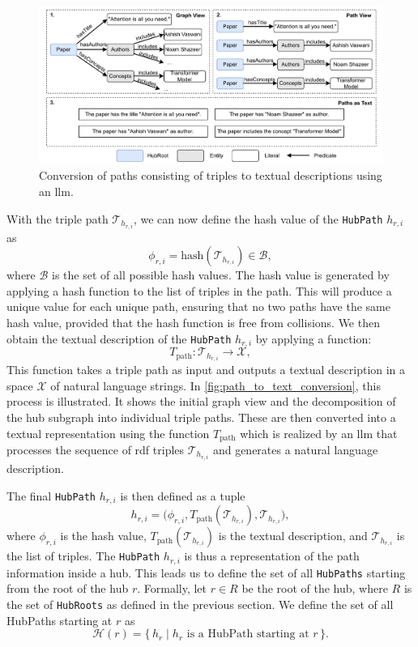\begin{figure}[t]
    \centering
    \includegraphics[width=1.0\linewidth]{figures/hublink/Hublink_figures-build_hubs.drawio.pdf}
    \caption[Path to Text Conversion]{Conversion of paths consisting of triples to textual descriptions using an \gls{llm}.}
    \label{fig:path_to_text_conversion}
\end{figure}

With the triple path $\mathcal{T}_{h_{r,i}}$, we can now define the hash value of the \texttt{HubPath} \(h_{r,i}\) as
\[
\phi_{r,i} = \text{hash}(\mathcal{T}_{h_{r,i}}) \in \mathcal{B},
\]
where \(\mathcal{B}\) is the set of all possible hash values. The hash value is generated by applying a hash function to the list of triples in the path. This will produce a unique value for each unique path, ensuring that no two paths have the same hash value, provided that the hash function is free from collisions. We then obtain the textual description of the \texttt{HubPath} \(h_{r,i}\) by applying a function:
\[
T_{\text{path}}: \mathcal{T}_{h_{r,i}} \to \mathcal{X},
\]
This function takes a triple path as input and outputs a textual description in a space \(\mathcal{X}\) of natural language strings. In \autoref{fig:path_to_text_conversion}, this process is illustrated. It shows the initial graph view and the decomposition of the hub subgraph into individual triple paths. These are then converted into a textual representation using the function \(T_{\text{path}}\) which is realized by an \gls{llm} that processes the sequence of \gls{rdf} triples $\mathcal{T}_{h_{r,i}}$ and generates a natural language description.

The final \texttt{HubPath} \(h_{r,i}\) is then defined as a tuple
\[
h_{r,i} = \bigl( \phi_{r,i}, T_{\text{path}}(\mathcal{T}_{h_{r,i}}), \mathcal{T}_{h_{r,i}} \bigr),
\]
where \(\phi_{r,i}\) is the hash value, \(T_{\text{path}}(\mathcal{T}_{h_{r,i}})\) is the textual description, and \(\mathcal{T}_{h_{r,i}}\) is the list of triples. The \texttt{HubPath} \(h_{r,i}\) is thus a representation of the path information inside a hub. This leads us to define the set of all \texttt{HubPaths} starting from the root of the hub \(r\). Formally, let \(r \in R\) be the root of the hub, where \(R\) is the set of \texttt{HubRoots} as defined in the previous section. 
We define the set of all HubPaths starting at \(r\) as
\[
\mathcal{H}(r) = \{\, h_r \mid h_r \text{ is a HubPath starting at } r \,\}.
\]

